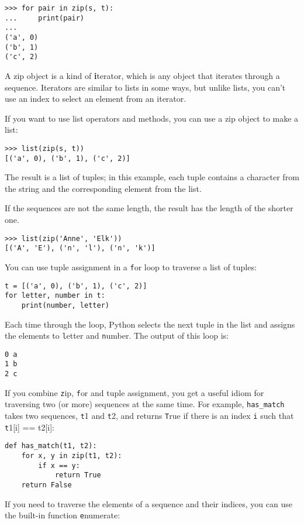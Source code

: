 \documentclass[
DIV=11,
fontsize=13,
twoside,
headinclude=false,
titlepage=firstiscover,
abstract=true,
headsepline=true,
footsepline=true,
chapterprefix=true, %
headings=big,
bibliography=totoc,%
captions=tableheading
]{scrbook}
\theoremstyle{definition}
\begin{document}
\begin{lstlisting}
>>> for pair in zip(s, t):
...     print(pair)
...
('a', 0)
('b', 1)
('c', 2)
\end{lstlisting}
%
A zip object is a kind of {\textbf iterator}, which is any object
that iterates through a sequence.  Iterators are similar to lists in some
ways, but unlike lists, you can't use an index to select an element from
an iterator.

If you want to use list operators and methods, you can
use a zip object to make a list:

\begin{lstlisting}
>>> list(zip(s, t))
[('a', 0), ('b', 1), ('c', 2)]
\end{lstlisting}
%
The result is a list of tuples; in this example, each tuple contains
a character from the string and the corresponding element from
the list.

If the sequences are not the same length, the result has the
length of the shorter one.

\begin{lstlisting}
>>> list(zip('Anne', 'Elk'))
[('A', 'E'), ('n', 'l'), ('n', 'k')]
\end{lstlisting}
%
You can use tuple assignment in a {\texttt for} loop to traverse a list of
tuples:

\begin{lstlisting}
t = [('a', 0), ('b', 1), ('c', 2)]
for letter, number in t:
    print(number, letter)
\end{lstlisting}
%
Each time through the loop, Python selects the next tuple in
the list and assigns the elements to {\texttt letter} and 
{\texttt number}.  The output of this loop is:

\begin{lstlisting}
0 a
1 b
2 c
\end{lstlisting}
%
If you combine {\texttt zip}, {\texttt for} and tuple assignment, you get a
useful idiom for traversing two (or more) sequences at the same
time.  For example, \verb"has_match" takes two sequences, {\texttt t1} and
{\texttt t2}, and returns {\texttt True} if there is an index {\texttt i}
such that {\texttt t1[i] == t2[i]}:

\begin{lstlisting}
def has_match(t1, t2):
    for x, y in zip(t1, t2):
        if x == y:
            return True
    return False
\end{lstlisting}
%
If you need to traverse the elements of a sequence and their
indices, you can use the built-in function {\texttt enumerate}:
\end{document}

